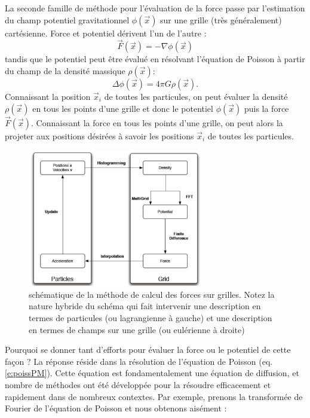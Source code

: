 La seconde famille de méthode pour l'évaluation de la force passe par l'estimation du champ potentiel gravitationnel $\phi(\vec x)$ sur une grille (très généralement) cartésienne. Force et potentiel dérivent l'un de l'autre :
\begin{equation}
\vec F (\vec x) =-\nabla \phi(\vec x)
\end{equation}
tandis que le potentiel peut être évalué en résolvant l'équation de Poisson à partir du champ de la densité massique $\rho(\vec x)$:
\begin{equation}
\Delta \phi(\vec x) = 4\pi G \rho(\vec x).
\label{e:poissPM}
\end{equation}
Connaissant la position $\vec x_i$ de toutes les particules, on peut évaluer la densité  $\rho(\vec x)$ en tous les points d'une grille et donc le potentiel $\phi(\vec x)$ puis la force $\vec F(\vec x)$. Connaissant la force en tous les points d'une grille, on peut alors la projeter aux positions désirées à savoir les positions $\vec x_i$ de toutes les particules.
\begin{figure}[htbp]
	\centering
		\includegraphics[height=6cm]{figs/PM.png}
	\caption[schématique de la méthode de calcul des forces sur grilles.]{schématique de la méthode de calcul des forces sur grilles. Notez la nature hybride du schéma qui fait intervenir une description en termes de particules (ou lagrangienne à gauche) et une description en termes de champs sur une grille (ou eulérienne à droite)}
	\label{f:PM}
\end{figure}
Pourquoi se donner tant d'efforts pour évaluer la force ou le potentiel de cette façon ? La réponse réside dans la résolution de l'équation de Poisson (eq. \ref{e:poissPM}). Cette équation est fondamentalement une équation de diffusion, et nombre de méthodes ont été développée pour la résoudre efficacement et rapidement dans de nombreux contextes. Par exemple, prenons la transformée de Fourier de l'équation de Poisson et nous obtenons aisément : 
